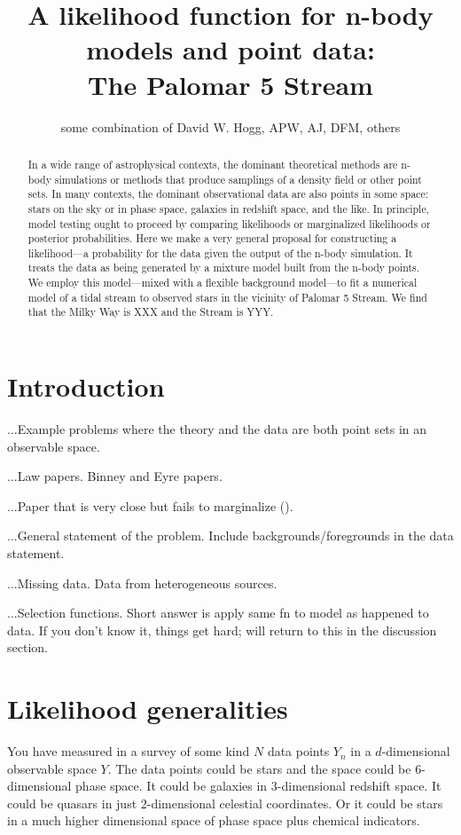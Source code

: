 \documentclass[12pt,pdftex,preprint]{aastex}
\begin{document}
\title{A likelihood function for n-body models and point data:\\
       The Palomar 5 Stream}
\author{some combination of David W. Hogg, APW, AJ, DFM, others}

\begin{abstract}
In a wide range of astrophysical contexts, the dominant theoretical
methods are n-body simulations or methods that produce samplings of a
density field or other point sets.  In many contexts, the dominant
observational data are also points in some space: stars on the sky or
in phase space, galaxies in redshift space, and the like.  In
principle, model testing ought to proceed by comparing likelihoods or
marginalized likelihoods or posterior probabilities.  Here we make a
very general proposal for constructing a likelihood---a probability
for the data given the output of the n-body simulation.  It treats the
data as being generated by a mixture model built from the n-body
points.  We employ this model---mixed with a flexible background
model---to fit a numerical model of a tidal stream to observed stars
in the vicinity of Palomar 5 Stream.  We find that the Milky Way is
XXX and the Stream is YYY.
\end{abstract}

\section{Introduction}

...Example problems where the theory and the data are both point sets in
an observable space.

...Law papers.  Binney and Eyre papers.

...Paper that is very close but fails to marginalize
(\citealt{varghese}).

...General statement of the problem.  Include backgrounds/foregrounds
in the data statement.

...Missing data.  Data from heterogeneous sources.

...Selection functions.  Short answer is apply same fn to model as
happened to data.  If you don't know it, things get hard; will return
to this in the discussion section.

\section{Likelihood generalities}

You have measured in a survey of some kind $N$ data points $Y_n$ in a
$d$-dimensional observable space $Y$.  The data points could be stars
and the space could be 6-dimensional phase space.  It could be
galaxies in 3-dimensional redshift space.  It could be quasars in just
2-dimensional celestial coordinates.  Or it could be stars in a much
higher dimensional space of phase space plus chemical indicators.
\end{document}
